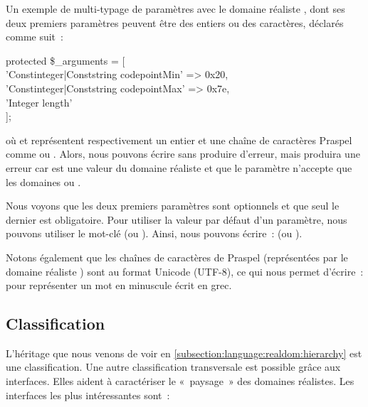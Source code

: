 \begin{example}

Un exemple de multi-typage de paramètres avec le domaine réaliste ,
dont ses deux premiers paramètres peuvent être des entiers ou des caractères,
déclarés comme suit~:
%
\begin{pre}
protected \$_arguments = [ \\
    'Constinteger|Conststring codepointMin' => 0x20, \\
    'Constinteger|Conststring codepointMax' => 0x7e, \\
    'Integer                  length' \\
];
\end{pre}
%
où  et  représentent respectivement un
entier et une chaîne de caractères Praspel comme  ou .
Alors, nous pouvons écrire  sans produire
d'erreur, mais  produira une erreur car
 est une valeur du domaine réaliste  et que le
paramètre  n'accepte que les domaines  ou
.

Nous voyons que les deux premiers paramètres sont optionnels et que seul le
dernier est obligatoire. Pour utiliser la valeur par défaut d'un paramètre, nous
pouvons utiliser le mot-clé  (ou ). Ainsi, nous pouvons
écrire~:  (ou ).

Notons également que les chaînes de caractères de Praspel (représentées par le
domaine réaliste ) sont au format Unicode (UTF-8), ce qui nous
permet d'écrire~:  pour représenter
un mot en minuscule écrit en grec.

\end{example}

\subsection{Classification}
\label{subsection:language:realdom:classification}

L'héritage que nous venons de voir en
\ref{subsection:language:realdom:hierarchy} est une classification. Une autre
classification {\strong transversale} est possible grâce aux {\strong
interfaces}. Elles aident à caractériser le «~paysage~» des domaines réalistes.
Les interfaces les plus intéressantes sont~:

